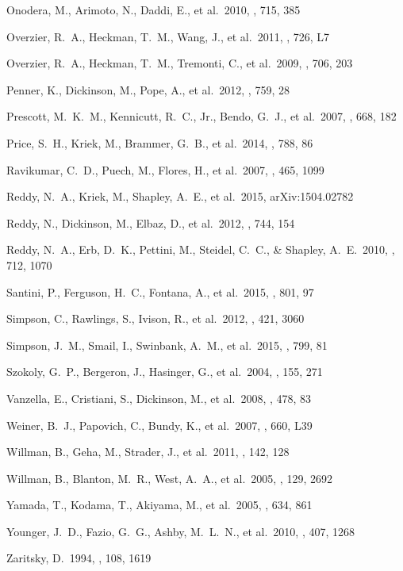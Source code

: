 \documentclass[referee]{aa}
\begin{document}
\begin{thebibliography}{}
 Onodera, M., Arimoto, 
N., Daddi, E., et al.\ 2010, \apj, 715, 385

 Overzier, R.~A., 
Heckman, T.~M., Wang, J., et al.\ 2011, \apjl, 726, L7 

 Overzier, R.~A., 
Heckman, T.~M., Tremonti, C., et al.\ 2009, \apj, 706, 203

 Penner, K., Dickinson, 
M., Pope, A., et al.\ 2012, \apj, 759, 28 

 Prescott, M.~K.~M., 
Kennicutt, R.~C., Jr., Bendo, G.~J., et al.\ 2007, \apj, 668, 182

 Price, S.~H., Kriek, M., 
Brammer, G.~B., et al.\ 2014, \apj, 788, 86

 Ravikumar, C.~D., Puech, M.,
Flores, H., et al.\ 2007, \aap, 465, 1099

 Reddy, N.~A., Kriek, M., 
Shapley, A.~E., et al.\ 2015, arXiv:1504.02782

 Reddy, N., Dickinson, M.,
Elbaz, D., et al.\ 2012, \apj, 744, 154 

 Reddy, N.~A., Erb, D.~K.,
Pettini, M., Steidel, C.~C., \& Shapley, A.~E.\ 2010, \apj, 712, 1070

 Santini, P., Ferguson, 
H.~C., Fontana, A., et al.\ 2015, \apj, 801, 97

 Simpson, C., Rawlings, 
S., Ivison, R., et al.\ 2012, \mnras, 421, 3060

 Simpson, J.~M., Smail, 
I., Swinbank, A.~M., et al.\ 2015, \apj, 799, 81

 Szokoly, G.~P., 
Bergeron, J., Hasinger, G., et al.\ 2004, \apjs, 155, 271

 Vanzella, E., Cristiani, S.,
Dickinson, M., et al.\ 2008, \aap, 478, 83

 Weiner, B.~J., Papovich, 
C., Bundy, K., et al.\ 2007, \apjl, 660, L39

 Willman, B., Geha, M., 
Strader, J., et al.\ 2011, \aj, 142, 128 

 Willman, B., Blanton, 
M.~R., West, A.~A., et al.\ 2005, \aj, 129, 2692

 Yamada, T., Kodama, T., 
Akiyama, M., et al.\ 2005, \apj, 634, 861

 Younger, J.~D., Fazio, 
G.~G., Ashby, M.~L.~N., et al.\ 2010, \mnras, 407, 1268

 Zaritsky, D.\ 1994, \aj, 108, 
1619

\end{thebibliography}
\end{document}
